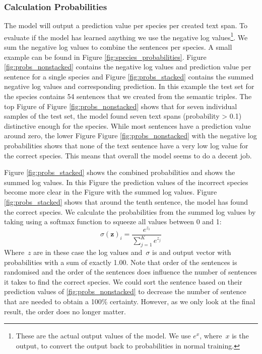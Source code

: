 \documentclass[a4paper, 12pt, oneside]{book} %
\begin{document}
\subsubsection{Calculation Probabilities}
The model will output a prediction value per species per created text span.
To evaluate if the model has learned anything we use the negative log values\footnote{These are the actual output values of the model. We use \(e^{x}\), where~$x$ is the output, to convert the output back to probabilities in normal training. }. 
We sum the negative log values to combine the sentences per species. 
A small example can be found in Figure \ref{fig:species_probabilities}.
Figure \ref{fig:probs_nonstacked} contains the negative log values and prediction value per sentence for a single species and Figure \ref{fig:probs_stacked} contains the summed negative log values and corresponding prediction.
In this example the test set for the species contains 54 sentences that we created from the semantic triples.
The top Figure of Figure \ref{fig:probs_nonstacked} shows that for seven individual samples of the test set, the model found seven text spans (probability > 0.1) distinctive enough for the species.
While most sentences have a prediction value around zero, the lower Figure Figure \ref{fig:probs_nonstacked} with the negative log probabilities shows that none of the text sentence have a very low log value for the correct species.
This means that overall the model seems to do a decent job.

Figure \ref{fig:probs_stacked} shows the combined probabilities and shows the summed log values.
In this Figure the prediction values of the incorrect species become more clear in the Figure with the summed log values.
Figure \ref{fig:probs_stacked} shows that around the tenth sentence, the model has found the correct species.
We calculate the probabilities from the summed log values by taking using a softmax function to squeeze all values between 0 and 1:
\begin{equation} \label{eq:softmax}
    \sigma(\mathbf{z})_i = \frac{e^{z_i}}{\sum_{j=1}^K e^{z_j}}
\end{equation}
Where~$z$ are in these case the log values and~$\sigma$ is and output vector with probabilities with a sum of exactly 1.00.
Note that order of the sentences is randomised and the order of the sentences does influence the number of sentences it takes to find the correct species.
We could sort the sentence based on their prediction values of \ref{fig:probs_nonstacked} to decrease the number of sentence that are needed to obtain a 100\% certainty.
However, as we only look at the final result, the order does no longer matter.
\end{document}
